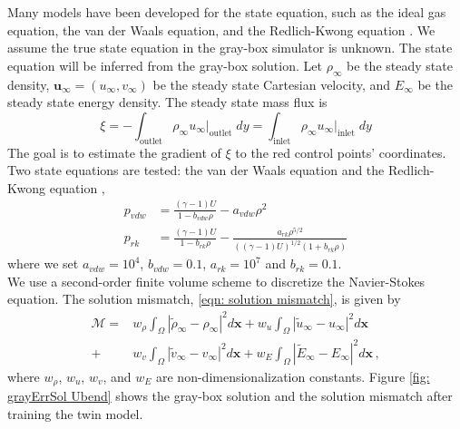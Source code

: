 Many models have been developed for the state equation, such as the ideal gas equation, the
van der Waals equation, and the Redlich-Kwong equation \cite{state eqns}.
We assume the true state equation in the gray-box simulator is unknown. 
The state equation will be inferred from the gray-box solution. 
Let $\rho_\infty$ be the steady state density,
$\boldsymbol{u}_\infty = (u_\infty, v_\infty)$ be the steady state Cartesian velocity,
and $E_\infty$ be the steady state energy density.
The steady state mass flux is
\begin{equation}
    \xi = - \int_{\textrm{outlet}} \rho_\infty u_\infty \big|_{\textrm{outlet}} \; dy=
    \int_{\textrm{inlet}} \rho_\infty u_\infty\big|_{\textrm{inlet}} \; dy
    \label{eqn: mass flux}
\end{equation}
The goal is to estimate the gradient of $\xi$
to the red control points' coordinates.
\\

Two state equations are tested: the van der Waals equation and the Redlich-Kwong equation
\cite{aero book, Redlich Kwong},
\begin{equation}\begin{split}
    p_{vdw} &= \frac{(\gamma-1)U}{1-b_{vdw}\rho} - a_{vdw}\rho^2\\
    p_{rk} &= \frac{(\gamma-1)U}{1-b_{rk}\rho} - 
    \frac{a_{rk}\rho^{5/2}}{((\gamma-1)U)^{1/2}(1+b_{rk}\rho)}
\end{split}\label{NS state equations}
\end{equation}
where we set $a_{vdw}=10^4$, $b_{vdw}=0.1$, $a_{rk}=10^7$ and $b_{rk}=0.1$.\\

We use a second-order finite volume scheme to discretize the Navier-Stokes equation.
The solution mismatch, \eqref{eqn: solution mismatch}, is given by
\begin{equation*}\begin{split}
    \mathcal{M} = &w_\rho \int_\Omega \left|\tilde{\rho}_{\infty} - \rho_{\infty}\right|^2 d\boldsymbol{x}
                + w_u
                \int_\Omega \left|\tilde{u}_{\infty}- u_{\infty}\right|^2 d\boldsymbol{x} \\
                + &w_v
                \int_\Omega \left| \tilde{v}_{\infty}- v_{\infty}\right|^2 d\boldsymbol{x}
                + w_E
                \int_\Omega \left|\tilde{E}_{\infty} - E_\infty\right|^2 d\boldsymbol{x}\,,
    \label{NS mismatch}
\end{split}\end{equation*}
where $w_\rho$, $w_u$, $w_v$, and $w_E$ are non-dimensionalization constants.
Figure \ref{fig: grayErrSol Ubend} shows the gray-box solution and the solution mismatch
after training the twin model.\\

